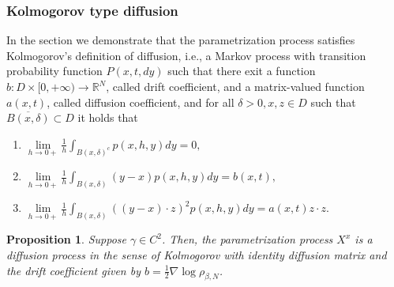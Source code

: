 \documentclass[11pt]{article}
\numberwithin{equation}{section}
\newtheorem{proposition}[theorem]{Proposition}
\theoremstyle{definition}
\begin{document}
\subsubsection*{Kolmogorov type diffusion}
In the section we demonstrate that the parametrization process satisfies Kolmogorov's definition of diffusion, i.e., a Markov process with transition probability function $P(x,t,dy)$ such that there exit a function $b:D\times [0,+\infty)\to\mathbb{R}^{N}$, called drift coefficient, and a matrix-valued function $a(x,t)$, called diffusion coefficient, and for all $\delta>0, x,z\in D$ such that $\overline{B(x,\delta)}\subset D$ it holds that 
\begin{enumerate}
    \item $\lim\limits_{h\to 0+}\frac{1}{h}\int_{B(x,\delta)^{c}}p(x,h,y)dy=0,$
    \item $\lim\limits_{h\to 0+}\frac{1}{h}\int_{B(x,\delta)}(y-x)p(x,h,y)dy = b(x,t),$
    \item $\lim\limits_{h\to 0+}\frac{1}{h}\int_{B(x,\delta)}((y-x)\cdot z )^2p(x,h,y)dy= a(x,t)z\cdot z.$
\end{enumerate}  
\begin{proposition}\label{prop::Kolmogorov_diffusion}
Suppose $\gamma \in C^{2}$.
Then, the parametrization process $X^{x}$ is a diffusion process in the sense of Kolmogorov with identity diffusion matrix and the drift coefficient given by $b =\frac{1}{2}\nabla\log\rho_{\beta, N}$.   
\end{proposition}
\end{document}
